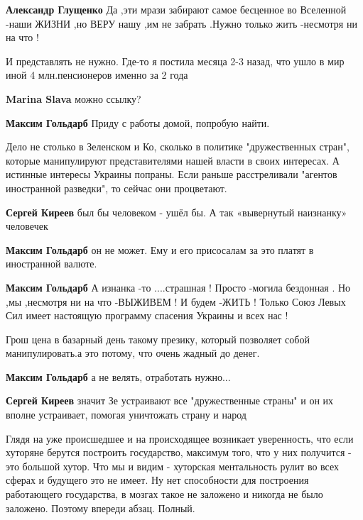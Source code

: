\begin{itemize}
\begin{itemize}
\textbf{Александр Глущенко} Да ,эти мрази забирают самое бесценное во Вселенной -наши ЖИЗНИ ,но ВЕРУ нашу ,им не забрать .Нужно только жить -несмотря ни на что !
\end{itemize} %


И представлять не нужно. Где-то я постила месяца 2-3 назад, что ушло в мир иной
4 млн.пенсионеров именно за 2 года

\begin{itemize} %
\textbf{Marina Slava} можно ссылку?

\textbf{Максим Гольдарб} Приду с работы домой, попробую найти.
\end{itemize} %


Дело не столько в Зеленском и Ко, сколько в политике "дружественных стран",
которые манипулируют представителями нашей власти в своих интересах. А истинные
интересы Украины попраны. Если раньше расстреливали "агентов иностранной
разведки", то сейчас они процветают.

\begin{itemize} %
\textbf{Сергей Киреев} был бы человеком - ушёл бы. А так «вывернутый наизнанку» человечек

\textbf{Максим Гольдарб} он не может. Ему и его присосалам за это платят в иностранной валюте.

\textbf{Максим Гольдарб} А изнанка -то ....страшная ! Просто -могила бездонная . Но ,мы ,несмотря ни на что -ВЫЖИВЕМ ! И будем -ЖИТЬ ! Только Союз Левых Сил имеет настоящую программу спасения Украины и всех нас !

Грош цена в базарный день такому презику, который позволяет собой манипулировать.а это потому, что очень жадный до денег.

\textbf{Максим Гольдарб} а не велять, отработать нужно...

\textbf{Сергей Киреев} значит Зе устраивают все "дружественные страны" и он их вполне устраивает, помогая уничтожать страну и народ
\end{itemize} %


Глядя на уже происшедшее и на происходящее возникает уверенность, что если
хуторяне берутся построить государство, максимум того, что у них получится -
это большой хутор. Что мы и видим - хуторская ментальность рулит во всех сферах
и будущего это не имеет. Ну нет способности для построения работающего
государства, в мозгах такое не заложено и никогда не было заложено. Поэтому
впереди абзац. Полный.


\end{itemize}
